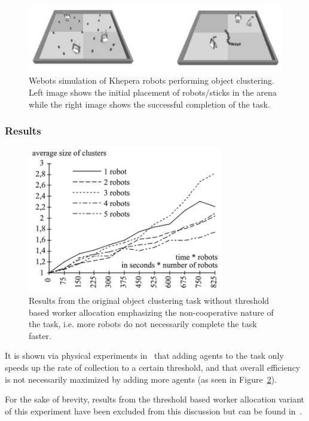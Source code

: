 \documentclass[Main.tex]{subfiles}
\begin{document}
\begin{figure}[!htb]
\centering\includegraphics[width=\textwidth]{assets/martinoliMondadaStickCollect.png}
\caption{Webots simulation of Khepera robots performing object clustering. Left image shows the initial placement of robots/sticks in the arena while the right image shows the successful completion of the task.}\label{fig:stickforage}
\end{figure}


\subsubsection*{Results}
\begin{figure}[!htb]
\centering\includegraphics[width=.5\textwidth]{assets/clusterRes.png}
\caption{Results from the original object clustering task without threshold based worker allocation emphasizing the non-cooperative nature of the task, i.e. more robots do not necessarily complete the task faster.}\label{fig:clusterres}
\end{figure}

It is shown via physical experiments in~\cite{Martinoli1995} that adding agents to the task only speeds up the rate of collection to a certain threshold, and that overall efficiency is not necessarily maximized by adding more agents (as seen in Figure~\ref{fig:clusterres}).

For the sake of brevity, results from the threshold based worker allocation variant of this experiment have been excluded from this discussion but can be found in~\cite{Agassounon2001,Agassounon2002a,agassounon2004}.


\end{document}
